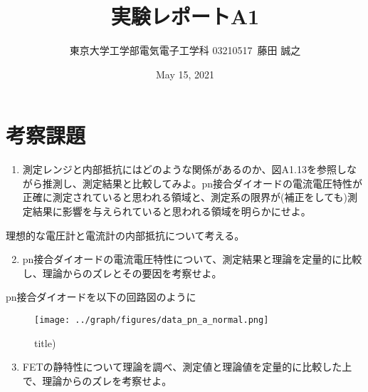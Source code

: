 \documentclass[a4j,dvipdfmx]{article}
\title{実験レポートA1}
\author{東京大学工学部電気電子工学科 03210517\ 藤田 誠之 }
\date{May 15, 2021}
\begin{document}

\maketitle

\section{考察課題}

\begin{enumerate}[label={(\arabic*)}]
  \item 測定レンジと内部抵抗にはどのような関係があるのか、図A1.13を参照しながら推測し、測定結果と比較してみよ。pn接合ダイオードの電流電圧特性が正確に測定されていると思われる領域と、測定系の限界が(補正をしても)測定結果に影響を与えられていると思われる領域を明らかにせよ。
\end{enumerate}
理想的な電圧計と電流計の内部抵抗について考える。


\begin{enumerate}[label={(\arabic*)}]
    \setcounter{enumi}{1}
    \item pn接合ダイオードの電流電圧特性について、測定結果と理論を定量的に比較し、理論からのズレとその要因を考察せよ。
\end{enumerate}

pn接合ダイオードを以下の回路図のように
\begin{figure}[H]
\begin{center}
\texttt{[image: ../graph/figures/data\_pn\_a\_normal.png]}
\caption{title)}
\end{center}
\end{figure}

\begin{enumerate}[label={(\arabic*)}]
  \setcounter{enumi}{2}
  \item FETの静特性について理論を調べ、測定値と理論値を定量的に比較した上で、理論からのズレを考察せよ。
\end{enumerate}
\end{document}
